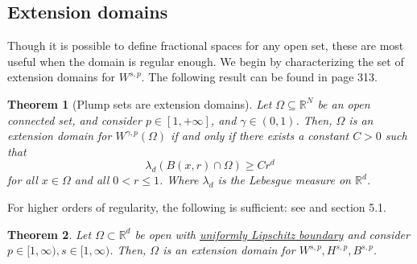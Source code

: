 \documentclass[
    a4paper,
    DIV=14,
    abstract=true,
    numbers=noenddot
]
{scrartcl}
\newtheorem{theorem}{Theorem}[section]
\theoremstyle{definition}
\newcommand{\R}{\mathbb{R}}
\begin{document}
\subsection{Extension domains}\label{extension domains}
Though it is possible to define fractional spaces for any open set, these are most useful when the domain is regular enough. We begin by characterizing the set of extension domains for $W^{s,p}$. The following result can be found in \cite{leoni2017first} page 313.
\begin{theorem}[Plump sets are extension domains]\label{plump sets}
    Let $\Omega \subseteq \mathbb{R}^N$ be an open connected set, and consider $p\in [1,+\infty]$, and $\gamma\in (0,1)$. Then, $\Omega$ is an extension domain for $W^{\gamma, p}(\Omega)$ if and only if there exists a constant $C>0$ such that
    $$
        \lambda_d(B(x, r) \cap \Omega) \geq C r^d
    $$
    for all $x \in \Omega$ and all $0<r \leq 1$. Where $\lambda_d$ is the Lebesgue measure on $\R^d$.
\end{theorem}
For higher orders of regularity, the following is sufficient: see \cite{leoni2023first} and \cite{sawano2018theory} section 5.1.
\begin{theorem}
    Let $\Omega \subset \R^d$ be open with \href{https://nowheredifferentiable.com/2023-07-12-PDEs-3-Sobolev_spaces/#:~:text=has-,uniformly%20Lipschitz%20boundary,-if%20there%20exists}{uniformly Lipschitz boundary} and consider   $p\in [1,\infty), s\in[1,\infty)$. Then, $\Omega $ is an extension domain for $W^{s,p},H^{s,p},B^{s,p}$.
\end{theorem}
\end{document}
